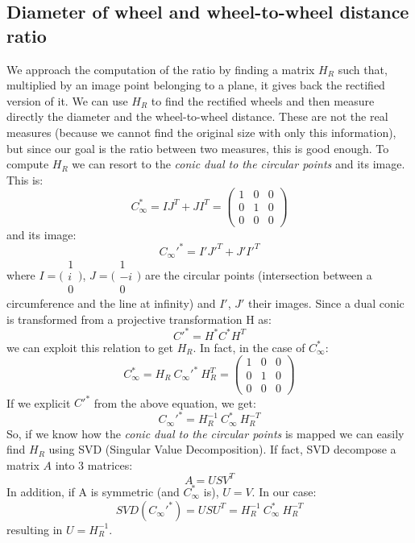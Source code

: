\documentclass{article}
\begin{document}
\subsection{Diameter of wheel and wheel-to-wheel distance ratio}
We approach the computation of the ratio by finding a matrix $H_R$ such that, multiplied by an image point belonging to a plane, it gives back the rectified version of it. We can use $H_R$ to find the rectified wheels and then measure directly the diameter and the wheel-to-wheel distance. These are not the real measures (because we cannot find the original size with only this information), but since our goal is the ratio between two measures, this is good enough.
To compute $H_R$ we can resort to the \textit{conic dual to the circular points} and its image. This is:
$$ C_\infty^* = IJ^T + JI^T = \begin{pmatrix}
1 & 0 & 0 \\
0 & 1 & 0 \\
0 & 0 & 0
\end{pmatrix}
$$
and its image:
\begin{equation}
C_\infty'^* = I'J'^T + J'I'^T
\end{equation}
where $I = \bigl(\begin{smallmatrix}1 \\ i \\ 0 \end{smallmatrix} \bigr)$, $J = \bigl(\begin{smallmatrix}1 \\ -i \\ 0 \end{smallmatrix} \bigr)$ are the circular points (intersection between a circumference and the line at infinity) and $I'$, $J'$ their images.
Since a dual conic is transformed from a projective transformation H as:
$$ C'^* = H^* C^* H^T $$
we can exploit this relation to get $H_R$. In fact, in the case of $C_\infty^*$:
$$ C_\infty^* = H_R \: C_\infty'^* \: H_R^T = \begin{pmatrix}
1 & 0 & 0 \\
0 & 1 & 0 \\
0 & 0 & 0
\end{pmatrix}$$
If we explicit $C'^*$ from the above equation, we get:
\begin{equation}
C_\infty'^* = H_R^{-1} \: C_\infty^* \: H_R^{-T}
\end{equation}
So, if we know how the \textit{conic dual to the circular points} is mapped we can easily find $H_R$ using SVD (Singular Value Decomposition).
If fact, SVD decompose a matrix $A$ into 3 matrices:
$$ A = USV^T $$
In addition, if A is symmetric (and $C_\infty^*$ is), $U=V$. In our case:
$$ SVD(C_\infty'^*) = USU^T = H_R^{-1} \: C_\infty^* \: H_R^{-T} $$
resulting in $U=H_R^{-1}$.
\end{document}
